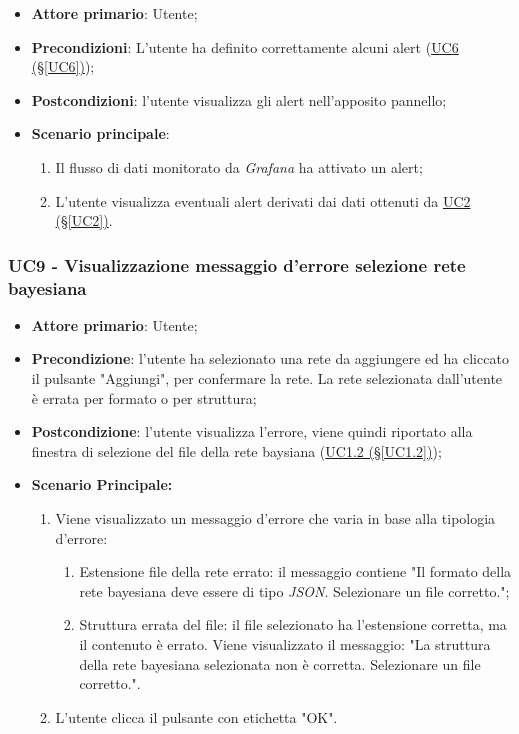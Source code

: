 \begin{itemize}
	\item \textbf{Attore primario}: Utente;
	\item \textbf{Precondizioni}: L'utente ha definito correttamente alcuni alert (\hyperref[UC6]{UC6 											(§\ref*{UC6})});
	\item \textbf{Postcondizioni}: l'utente visualizza gli alert nell'apposito pannello;
	\item \textbf{Scenario principale}:
	\begin{enumerate}
		\item Il flusso di dati monitorato da \textit{Grafana} ha attivato un alert;
		\item L'utente visualizza eventuali alert derivati dai dati ottenuti da  \hyperref[UC2]{UC2 (§\ref*{UC2})}.
	\end{enumerate}
\end{itemize}

\pagebreak

\subsubsection{UC9 - Visualizzazione messaggio d'errore selezione  rete bayesiana}\label{UC9}
\begin{itemize}
\item \textbf{Attore primario}: Utente;
\item \textbf{Precondizione}: l'utente ha selezionato una rete da aggiungere ed ha cliccato il pulsante "Aggiungi", per confermare la rete. La rete selezionata dall'utente è errata per formato o per struttura;
\item \textbf{Postcondizione}: l'utente visualizza l'errore, viene quindi riportato alla finestra di selezione del file della rete baysiana (\hyperref[UC1.2]{UC1.2 (§\ref*{UC1.2})});
\item \textbf{Scenario Principale:} 
	\begin{enumerate}
		\item Viene visualizzato un messaggio d'errore che varia in base alla tipologia d'errore:
			\begin{enumerate}
				\item Estensione file della rete errato: il messaggio contiene "Il formato della rete bayesiana deve essere di tipo \textit{JSON}. Selezionare un file corretto.";
				\item Struttura errata del file: il file selezionato ha l'estensione corretta, ma il contenuto è errato. Viene visualizzato il messaggio: "La struttura della rete bayesiana selezionata non è corretta. Selezionare un file corretto.".
			\end{enumerate}
		\item L'utente clicca il pulsante con etichetta "OK".
	\end{enumerate}
\end{itemize}

